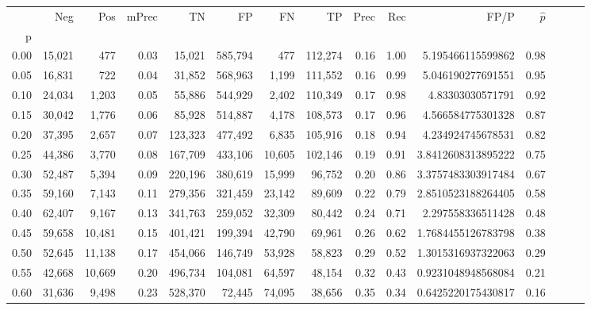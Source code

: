 \begin{tabular}{rrrrrrrrrrrrrrr}
\toprule
{} &     Neg &     Pos & mPrec &       TN &       FP &       FN &       TP &  Prec &   Rec &                 FP/P & $\hat{p}$ \\
p    &         &         &       &          &          &          &          &       &       &                      &           \\
\midrule
0.00 &  15,021 &     477 &  0.03 &   15,021 &  585,794 &      477 &  112,274 &  0.16 &  1.00 &    5.195466115599862 &      0.98 \\
0.05 &  16,831 &     722 &  0.04 &   31,852 &  568,963 &    1,199 &  111,552 &  0.16 &  0.99 &    5.046190277691551 &      0.95 \\
0.10 &  24,034 &   1,203 &  0.05 &   55,886 &  544,929 &    2,402 &  110,349 &  0.17 &  0.98 &     4.83303030571791 &      0.92 \\
0.15 &  30,042 &   1,776 &  0.06 &   85,928 &  514,887 &    4,178 &  108,573 &  0.17 &  0.96 &    4.566584775301328 &      0.87 \\
0.20 &  37,395 &   2,657 &  0.07 &  123,323 &  477,492 &    6,835 &  105,916 &  0.18 &  0.94 &    4.234924745678531 &      0.82 \\
0.25 &  44,386 &   3,770 &  0.08 &  167,709 &  433,106 &   10,605 &  102,146 &  0.19 &  0.91 &   3.8412608313895222 &      0.75 \\
0.30 &  52,487 &   5,394 &  0.09 &  220,196 &  380,619 &   15,999 &   96,752 &  0.20 &  0.86 &   3.3757483303917484 &      0.67 \\
0.35 &  59,160 &   7,143 &  0.11 &  279,356 &  321,459 &   23,142 &   89,609 &  0.22 &  0.79 &   2.8510523188264405 &      0.58 \\
0.40 &  62,407 &   9,167 &  0.13 &  341,763 &  259,052 &   32,309 &   80,442 &  0.24 &  0.71 &    2.297558336511428 &      0.48 \\
0.45 &  59,658 &  10,481 &  0.15 &  401,421 &  199,394 &   42,790 &   69,961 &  0.26 &  0.62 &   1.7684455126783798 &      0.38 \\
0.50 &  52,645 &  11,138 &  0.17 &  454,066 &  146,749 &   53,928 &   58,823 &  0.29 &  0.52 &   1.3015316937322063 &      0.29 \\
0.55 &  42,668 &  10,669 &  0.20 &  496,734 &  104,081 &   64,597 &   48,154 &  0.32 &  0.43 &   0.9231048948568084 &      0.21 \\
0.60 &  31,636 &   9,498 &  0.23 &  528,370 &   72,445 &   74,095 &   38,656 &  0.35 &  0.34 &   0.6425220175430817 &      0.16 \\

\end{tabular}
